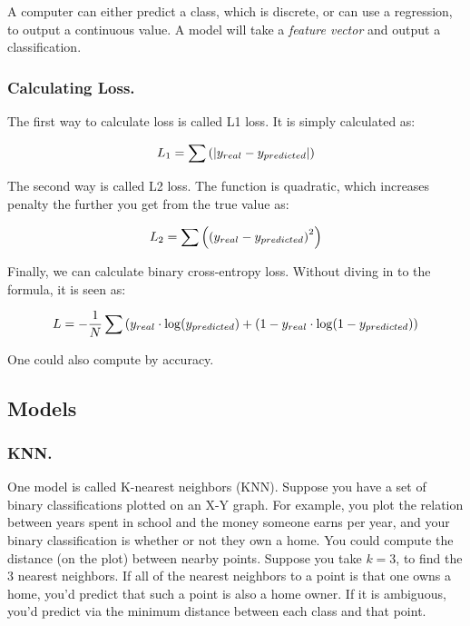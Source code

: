 A computer can either predict a class, which is discrete, or can use a regression, to output a continuous value. A model will take a \textit{feature vector} and output a classification. 


\subsubsection{Calculating Loss.}
The first way to calculate loss is called L1 loss. It is simply calculated as: 

\begin{equation}
\begin{split}
    L_1 = \sum \left(| y_{real} - y_{predicted}|\right)
\end{split}
\end{equation}

The second way is called L2 loss. The function is quadratic, which increases penalty the further you get from the true value as: 

\begin{equation}
\begin{split}
    L_2 = \sum \left(\left(y_{real} - y_{predicted}\right)^2\right)
\end{split}
\end{equation}

Finally, we can calculate binary cross-entropy loss. Without diving in to the formula, it is seen as: 

\begin{equation}
\begin{split}
    L = -\frac{1}{N}\sum \left(y_{real} \cdot \log(y_{predicted}) + (1-y_{real}\cdot\log(1-y_{predicted})\right)
\end{split}
\end{equation}

One could also compute by accuracy. 

\subsection{Models}

\subsubsection{KNN.}
One model is called K-nearest neighbors (KNN). Suppose you have a set of binary classifications plotted on an X-Y graph. For example, you plot the relation between years spent in school and the money someone earns per year, and your binary classification is whether or not they own a home. You could compute the distance (on the plot) between nearby points. Suppose you take $k = 3$, to find the 3 nearest neighbors. If all of the nearest neighbors to a point is that one owns a home, you'd predict that such a point is also a home owner. If it is ambiguous, you'd predict via the minimum distance between each class and that point. 

